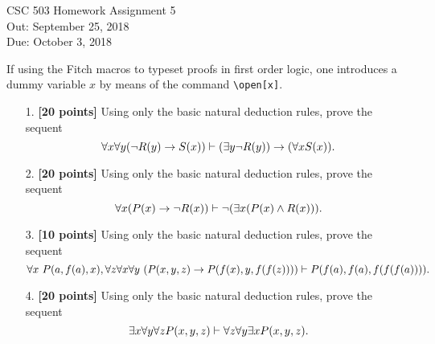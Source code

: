 \documentclass{article}
\begin{document}
\begin{center}
  {\LARGE CSC 503 Homework Assignment 5}\\[1pc]
  Out: September 25, 2018 \\
  Due: October 3, 2018 \\
\end{center}

If using the Fitch macros to typeset proofs in first order logic, one
introduces a dummy variable $x$ by means of the command
\verb+\open[x]+. 

\begin{enumerate}
\item[1.] \textbf{[20 points]} Using only the basic natural deduction
  rules, prove  the sequent
  \begin{displaymath}
    \forall x \forall y (\neg R(y) \rightarrow S(x))
    \vdash
    (\exists y \neg R(y)) \rightarrow (\forall x S(x)).
\end{displaymath}
\end{enumerate}

\begin{enumerate}
\item[2.] \textbf{[20 points]} Using only the basic natural deduction
  rules, prove  the sequent
  \begin{displaymath}
    \forall x (P(x) \rightarrow \neg R(x))
    \vdash
    \neg( \exists x ( P(x) \land R(x))).
  \end{displaymath}
\end{enumerate}

\begin{enumerate}
\item[3.] \textbf{[10 points]} Using only the basic natural deduction
  rules, prove  the sequent
  \begin{displaymath}
    \forall x\ P(a,f(a),x),
    \forall z \forall x \forall y\ (P(x,y,z) \rightarrow P(f(x),y,f(f(z)))) 
    \vdash
    P(f(a),f(a),f(f(f(a)))).
  \end{displaymath}
\end{enumerate}

\begin{enumerate}
\item[4.] \textbf{[20 points]} Using only the basic natural deduction
  rules, prove  the sequent
  \begin{displaymath}
    \exists x \forall y \forall z P(x,y,z)
    \vdash
    \forall z \forall y \exists x P(x,y,z).
\end{displaymath}
\end{enumerate}
\end{document}
